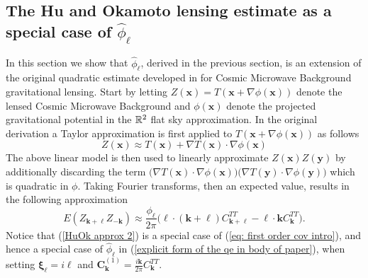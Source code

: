 \documentclass[10pt,noinfoline]{imsart}
\newcommand{\bs}{\boldsymbol}
\begin{document}
\subsection{The Hu and Okamoto lensing estimate as a special case of $\hat\phi_{\bs \ell}$}
\label{section: Hu and Okamoto lensing special case}

In this section we show that $\hat \phi_{\bs \ell}$, derived in the previous section, is an extension of the original quadratic estimate developed in \cite{hu2001mapping, hu2002mass} for Cosmic Microwave Background gravitational lensing. Start by letting $Z(\bs x) = T(\bs x + \nabla \phi(\bs x))$  denote the lensed Cosmic Microwave Background  and $\phi(\bs x)$ denote the projected gravitational potential in the $\Bbb R^2$ flat sky approximation. In the original derivation \cite{hu2001mapping, hu2002mass} a Taylor approximation is first applied to $T(\bs x+ \nabla \phi(\bs x))$ as follows
\begin{equation}
\label{HuOk approx 1}
Z(\bs x) \approx T(\bs x) +  \nabla T(\bs x)\cdot\nabla \phi(\bs x)
\end{equation}
The above linear model is then used to linearly approximate $Z(\bs x)Z(\bs y)$ by additionally discarding the term $\big(\nabla T(\bs x)\cdot\nabla \phi(\bs x)\big) \big(\nabla T(\bs y)\cdot\nabla \phi(\bs y)\big)$ which is quadratic in $\phi$. Taking Fourier transforms, then an expected value, results in the following approximation
\begin{equation}
\label{HuOk approx 2}
E(Z_{\bs k+\bs \ell}Z_{-\bs k}) \approx \frac{\phi_{\bs \ell}}{2\pi} \Big(\bs \ell\cdot(\bs k+\bs \ell)C^{TT}_{\bs k+\bs \ell} - \bs \ell\cdot\bs k C^{TT}_{\bs k}\Big).
\end{equation}
Notice that (\ref{HuOk approx 2}) is a special case of (\ref{eq: first order cov intro}), and hence a special case of $\hat\phi_{\bs \ell}$ in (\ref{explicit form of the qe in body of paper}), when setting $\bs \xi_{\bs \ell} = i\bs \ell$ and $\bs C^{(1)}_{\bs k} = \frac{i\bs k}{2\pi}  C^{TT}_{\bs k}$.
\end{document}
